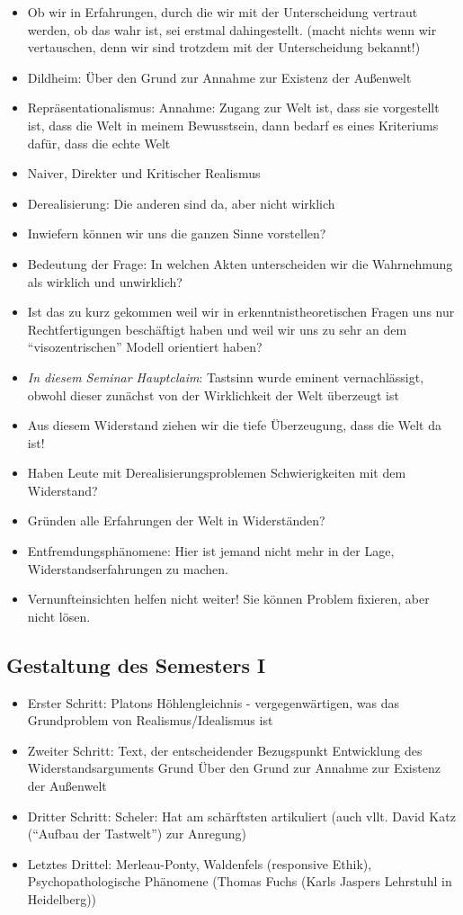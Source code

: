 \documentclass[emulatestandardclasses]{scrartcl}
\begin{document}
\begin{itemize}
  \item Ob wir in Erfahrungen, durch die wir mit der Unterscheidung vertraut werden, ob das wahr ist, sei erstmal dahingestellt. (macht nichts wenn wir vertauschen, denn wir sind trotzdem mit der Unterscheidung bekannt!)
  \item Dildheim: Über den Grund zur Annahme zur Existenz der Außenwelt 
  \item Repräsentationalismus: Annahme: Zugang zur Welt ist, dass sie vorgestellt ist, dass die Welt in meinem Bewusstsein, dann bedarf es eines Kriteriums dafür, dass die echte Welt 
  \item Naiver, Direkter und Kritischer Realismus
  \item Derealisierung: Die anderen sind da, aber nicht wirklich
  \item Inwiefern können wir uns die ganzen Sinne vorstellen?
  \item Bedeutung der Frage: In welchen Akten unterscheiden wir die Wahrnehmung als wirklich und unwirklich?
  \item Ist das zu kurz gekommen weil wir in erkenntnistheoretischen Fragen uns nur Rechtfertigungen beschäftigt haben und weil wir uns zu sehr an dem "`visozentrischen"' Modell orientiert haben?
  \item \emph{In diesem Seminar Hauptclaim}: Tastsinn wurde eminent vernachlässigt, obwohl dieser zunächst von der Wirklichkeit der Welt überzeugt ist
  \item Aus diesem Widerstand ziehen wir die tiefe Überzeugung, dass die Welt da ist!
  \item Haben Leute mit Derealisierungsproblemen Schwierigkeiten mit dem Widerstand?
  \item Gründen alle Erfahrungen der Welt in Widerständen?
  \item Entfremdungsphänomene: Hier ist jemand nicht mehr in der Lage, Widerstandserfahrungen zu machen.
  \item Vernunfteinsichten helfen nicht weiter! Sie können Problem fixieren, aber nicht lösen.
\end{itemize}

\subsection{Gestaltung des Semesters I}

\begin{itemize}
  \item Erster Schritt: Platons Höhlengleichnis - vergegenwärtigen, was das Grundproblem von Realismus/Idealismus ist
  \item Zweiter Schritt: Text, der entscheidender Bezugspunkt Entwicklung des Widerstandsarguments Grund Über den Grund zur Annahme zur Existenz der Außenwelt
  \item Dritter Schritt: Scheler: Hat am schärftsten artikuliert (auch vllt. David Katz ("`Aufbau der Tastwelt"') zur Anregung)
  \item Letztes Drittel: Merleau-Ponty, Waldenfels (responsive Ethik), Psychopathologische Phänomene (Thomas Fuchs (Karls Jaspers Lehrstuhl in Heidelberg))	
\end{itemize}
\end{document}

